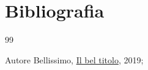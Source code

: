 \newpage
\section{Bibliografia}

\begingroup
\renewcommand{\section}[2]{}
\begin{thebibliography} {99}

    Autore Bellissimo,
    \href{http://linkottimo.it}{Il bel titolo},
    2019;
    
\end{thebibliography}
\endgroup